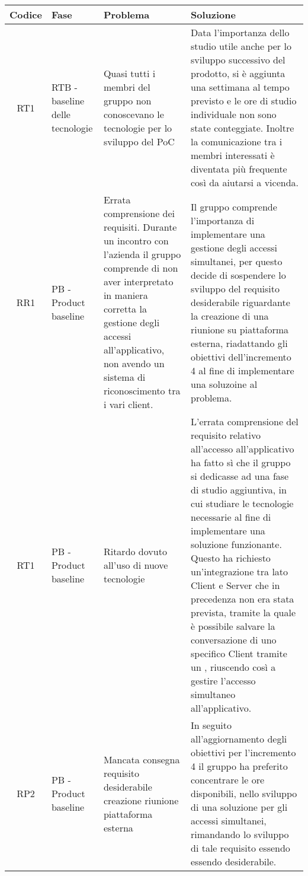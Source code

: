 \begin{center}
\renewcommand{\arraystretch}{1.8} %
\begin{longtable}{ |c|p{8em}|p{12em}|p{12em}| }
	\hline
	\textbf{Codice} & \textbf{Fase} & \textbf{Problema} &  \textbf{Soluzione} \\
	\hline
    RT1 & RTB - baseline delle tecnologie & Quasi tutti i membri del gruppo non conoscevano le tecnologie per lo sviluppo del PoC & Data l'importanza dello studio utile anche per lo sviluppo successivo del prodotto, si è aggiunta una settimana al tempo previsto e le ore di studio individuale non sono state conteggiate. \newline Inoltre la comunicazione tra i membri interessati è diventata più frequente così da aiutarsi a vicenda.\\
    \hline
	RR1 & PB - Product baseline & Errata comprensione dei requisiti. Durante un incontro con l'azienda il gruppo comprende di non aver interpretato in maniera corretta la gestione degli accessi all'applicativo, non avendo un sistema di riconoscimento tra i vari client. & Il gruppo comprende l'importanza di implementare una gestione degli accessi simultanei, per questo decide di sospendere lo sviluppo del requisito desiderabile riguardante la creazione di una riunione su piattaforma esterna, riadattando gli obiettivi dell'incremento 4 al fine di implementare una soluzoine al problema.\\
	\hline
	RT1 & PB - Product baseline & Ritardo dovuto all'uso di nuove tecnologie & L'errata comprensione del requisito relativo all'accesso all'applicativo ha fatto sì che il gruppo si dedicasse ad una fase di studio aggiuntiva, in cui studiare le tecnologie necessarie al fine di implementare una soluzione funzionante. Questo ha richiesto un'integrazione tra lato Client e Server che in precedenza non era stata prevista, tramite la quale è possibile salvare la conversazione di uno specifico Client tramite un \glossario{UUID}, riuscendo così a gestire l'accesso simultaneo all'applicativo.\\
	\hline
	RP2 & PB - Product baseline & Mancata consegna requisito desiderabile creazione riunione piattaforma esterna & In seguito all'aggiornamento degli obiettivi per l'incremento 4 il gruppo ha preferito concentrare le ore disponibili, nello sviluppo di una soluzione per gli accessi simultanei, rimandando lo sviluppo di tale requisito essendo essendo desiderabile. \\
	\hline
	
\end{longtable}
\end{center}
\newpage